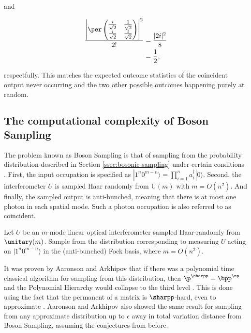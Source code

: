 \noindent and

\begin{align}
\frac{\left|\per\begin{pmatrix}\frac{i}{\sqrt{2}}&\frac{1}{\sqrt{2}}\\\frac{i}{\sqrt{2}}&\frac{1}{\sqrt{2}}\end{pmatrix}\right|^2}{2!} &= \frac{|2i|^2}{8}\\
&= \frac{1}{2},
\end{align}

\noindent respectfully. This matches the expected outcome statistics of the coincident output never occurring and the two other possible outcomes happening purely at random.

\subsection{The computational complexity of Boson Sampling}
\label{ssec:cc-bs}

The problem known as Boson Sampling is that of sampling from the probability distribution described in Section \ref{ssec:bosonic-sampling} under certain conditions \cite{aaronson2010report, aaronson2011}. First, the input occupation is specified as $|1^n 0^{m - n}\rangle = \prod_{i = 1}^n a_{i}^\dagger|0\rangle$. Second, the interferometer $U$ is sampled Haar randomly from U$(m)$ with $m=O(n^2)$. And finally, the sampled output is anti-bunched, meaning that there is at most one photon in each spatial mode. Such a photon occupation is also referred to as coincident.

\begin{problem} Let $U$ be an $m$-mode linear optical interferometer sampled Haar-randomly from $\unitary(m)$. Sample from the distribution corresponding to measuring $U$ acting on $|1^n0^{m-n}\rangle$ in the (anti-bunched) Fock basis, where $m=O(n^2)$.
\end{problem}

It was proven by Aaronson and Arkhipov that if there was a polynomial time classical algorithm for sampling from this distribution, then $\p^{\sharpp} = \bpp^{\np}$ and the Polynomial Hierarchy would collapse to the third level \cite{aaronson2010report, aaronson2011}. This is done using the fact that the permanent of a matrix is $\sharpp$-hard, even to approximate \cite{valiant1979, aaronson2011sharpp}. Aaronson and Arkhipov also showed the same result for sampling from any approximate distribution up to $\epsilon$ away in total variation distance from Boson Sampling, assuming the conjectures from before.

